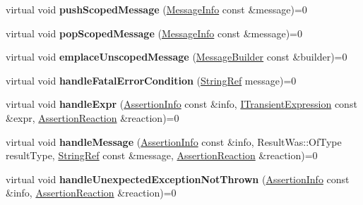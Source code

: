 \begin{DoxyCompactItemize}
\item 
\mbox{\label{structCatch_1_1IResultCapture_a91d154c1e087e383dcde5aad95cb6a05}} 
virtual void {\bfseries push\+Scoped\+Message} (\hyperlink{structCatch_1_1MessageInfo}{Message\+Info} const \&message)=0
\item 
\mbox{\label{structCatch_1_1IResultCapture_a42bcb13276706bf8c3ce081ce16d37fd}} 
virtual void {\bfseries pop\+Scoped\+Message} (\hyperlink{structCatch_1_1MessageInfo}{Message\+Info} const \&message)=0
\item 
\mbox{\label{structCatch_1_1IResultCapture_a49f74f1323ef8be71b8f9b8e8b2c0fc2}} 
virtual void {\bfseries emplace\+Unscoped\+Message} (\hyperlink{structCatch_1_1MessageBuilder}{Message\+Builder} const \&builder)=0
\item 
\mbox{\label{structCatch_1_1IResultCapture_a48559e6598ba9474b903697b69c769b2}} 
virtual void {\bfseries handle\+Fatal\+Error\+Condition} (\hyperlink{classCatch_1_1StringRef}{String\+Ref} message)=0
\item 
\mbox{\label{structCatch_1_1IResultCapture_a59a2b05391e464954575d2afb6d5d607}} 
virtual void {\bfseries handle\+Expr} (\hyperlink{structCatch_1_1AssertionInfo}{Assertion\+Info} const \&info, \hyperlink{structCatch_1_1ITransientExpression}{I\+Transient\+Expression} const \&expr, \hyperlink{structCatch_1_1AssertionReaction}{Assertion\+Reaction} \&reaction)=0
\item 
\mbox{\label{structCatch_1_1IResultCapture_a21788ebc64571abf322b80c8cc51794d}} 
virtual void {\bfseries handle\+Message} (\hyperlink{structCatch_1_1AssertionInfo}{Assertion\+Info} const \&info, Result\+Was\+::\+Of\+Type result\+Type, \hyperlink{classCatch_1_1StringRef}{String\+Ref} const \&message, \hyperlink{structCatch_1_1AssertionReaction}{Assertion\+Reaction} \&reaction)=0
\item 
\mbox{\label{structCatch_1_1IResultCapture_a6382ed20486e2d9a020da971c6d5c53d}} 
virtual void {\bfseries handle\+Unexpected\+Exception\+Not\+Thrown} (\hyperlink{structCatch_1_1AssertionInfo}{Assertion\+Info} const \&info, \hyperlink{structCatch_1_1AssertionReaction}{Assertion\+Reaction} \&reaction)=0

\end{DoxyCompactItemize}
